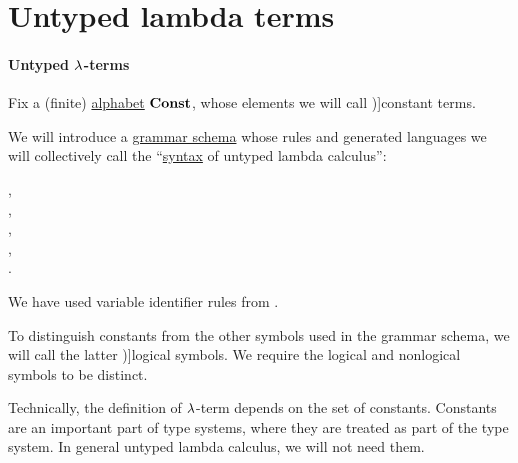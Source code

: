 \section{Untyped lambda terms}\label{sec:untyped_lambda_terms}

\paragraph{Untyped \( \synlambda \)-terms}

\begin{definition}\label{def:lambda_term}\mimprovised
  Fix a (finite) \hyperref[def:formal_language/alphabet]{alphabet} \( \op*{Const} \), whose elements we will call \term[en=constant (\cite[202]{Andrews2002Logic})]{constant terms}.

  We will introduce a \hyperref[def:formal_grammar/schema]{grammar schema} whose rules and generated languages we will collectively call the \enquote{\hyperref[con:syntax_semantics_duality]{syntax} of untyped lambda calculus}:
  \begin{bnf*}
        {}, \\
            { \bnfor {}}, \\
     {\bnftsq{\( ( \)} \bnfsp {} \bnfsp {} \bnfsp \bnftsq{\( ) \)}}, \\
     {\bnftsq{\( ( \)} \bnfsp \bnftsq{\( \synlambda \)} \bnfsp {} \bnfsp {} \bnfsp {} \bnfsp \bnftsq{\( ) \)}}, \\
            { \bnfor {} \bnfor {}}.
  \end{bnf*}

  We have used variable identifier rules from .

  To distinguish constants from the other symbols used in the grammar schema, we will call the latter \term[en=logical symbol (\cite[2]{Hinman2005Logic})]{logical symbols}. We require the logical and nonlogical symbols to be distinct.

  \begin{thmenum}
     Technically, the definition of \( \synlambda \)-term depends on the set of constants. Constants are an important part of type systems, where they are treated as part of the type system. In general untyped lambda calculus, we will not need them.


\end{thmenum}
\end{definition}
